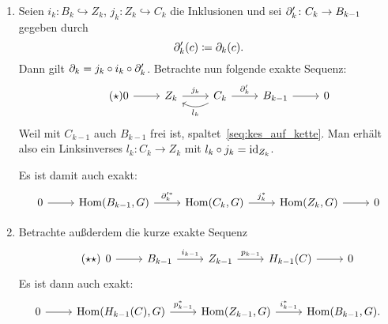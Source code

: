 
\begin{vorbereitung}
  \begin{enumerate}
    \item
      Seien $i_k \colon B_k \hookrightarrow Z_k$, $j_k \colon Z_k \hookrightarrow C_k$ die Inklusionen und sei $\partial_k'\colon C_k \to B_{k-1}$ gegeben durch
      \begin{equation*}
        \partial_k'(c) \coloneqq \partial_k(c).
      \end{equation*}
      Dann gilt $\partial_k = j_k \circ i_k \circ \partial_k'$.
      Betrachte nun folgende exakte Sequenz:
      \begin{equation}
        \begin{tikzcd}
          \tag{$\star$}
          \label{seq:kes_auf_kette}
          0 \arrow{r}{} & Z_k \arrow{r}{j_k}
          & C_k \arrow[bend left]{l}{l_k}
          \arrow{r}{\del_k'}
          & B_{k-1} \arrow{r}{}
          & 0
        \end{tikzcd}
      \end{equation}
      Weil mit $C_{k-1}$ auch $B_{k-1}$ frei ist, spaltet~\eqref{seq:kes_auf_kette}.
      Man erhält also ein Linksinverses $l_k \colon C_k \to Z_k$ mit $l_k \circ j_k = \operatorname{id}_{Z_k}$.

      Es ist damit auch exakt:
      \begin{equation*}
        \begin{tikzcd}
          0 \arrow{r}{}
          & \Hom(B_{k-1},G) \arrow{r}{\del_k'^*}
          & \Hom(C_k,G) \arrow{r}{j_k^*}
          & \Hom(Z_k,G) \arrow{r}{}
          & 0
        \end{tikzcd}
      \end{equation*}
    \item
      Betrachte außderdem die kurze exakte Sequenz
      \begin{equation}
        \tag{$\star\star$}
        \label{seq:kes_mit_homologie}
        \begin{tikzcd}
          0 \arrow{r}{}
          & B_{k-1} \arrow{r}{i_{k-1}}
          & Z_{k-1} \arrow{r}{p_{k-1}}
          & H_{k-1}(C) \arrow{r}{}
          & 0
        \end{tikzcd}
      \end{equation}
      Es ist dann auch exakt:
      \begin{equation*}
        \begin{tikzcd}
          0 \arrow{r}{}
          & \Hom(H_{k-1}(C),G) \arrow{r}{p_{k-1}^*}
          & \Hom(Z_{k-1},G) \arrow{r}{i_{k-1}^*}
          & \Hom(B_{k-1},G).
        \end{tikzcd}
      \end{equation*}
  \end{enumerate}
\end{vorbereitung}

